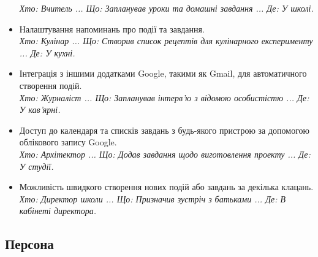 \documentclass[oneside,14pt]{extarticle}
\begin{document}
\begin{normalsize}
\begin{itemize}
		\textit{Хто: Вчитель ... Що: Запланував уроки та домашні завдання ... Де: У школі.}
		\item Налаштування напоминань про події та завдання.\\
		\textit{Хто: Кулінар ... Що: Створив список рецептів для кулінарного експерименту ... Де: У кухні.}
		\item Інтеграція з іншими додатками Google, такими як Gmail, для автоматичного створення подій.\\
		\textit{Хто: Журналіст ... Що: Запланував інтерв'ю з відомою особистістю ... Де: У кав'ярні.}
		\item Доступ до календаря та списків завдань з будь-якого пристрою за допомогою облікового запису Google.\\
		\textit{Хто: Архітектор ... Що: Додав завдання щодо виготовлення проекту ... Де: У студії.}
		\item Можливість швидкого створення нових подій або завдань за декілька клацань.\\
		\textit{Хто: Директор школи ... Що: Призначив зустріч з батьками ... Де: В кабінеті директора.}
	\end{itemize}
	
	\subsection*{Персона}
	

\end{normalsize}
\end{document}
